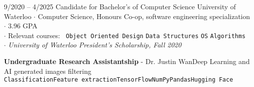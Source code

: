 \documentclass[8pt]{developercv} %
\begin{document}

\begin{minipage}[t]{\textwidth}
	\vspace{-\baselineskip} %

	\begin{entrylist}
		\entry
			{9/2020 -- 4/2025}
			{Candidate for Bachelor's of Computer Science}
			{University of Waterloo}
			{
				$\cdot$ Computer Science, Honours Co-op, software engineering specialization\\
				$\cdot$ 3.96 GPA\\
				$\cdot$ Relevant courses:
					\texttt{ Object Oriented Design}\slashsep
					\texttt{Data Structures}\slashsep
					\texttt{OS}\slashsep
					\texttt{Algorithms}\\
				$\cdot$ \textit{University of Waterloo President's Scholarship, Fall 2020}
			}
	\end{entrylist}
\end{minipage}



	



	\begin{minipage}[t]{\textwidth}
		\vspace{-\baselineskip} %
		\textbf{Undergraduate Research Assistantship} - Dr. Justin Wan\slashsep Deep Learning and AI generated images filtering \\
    \texttt{Classification}\slashsep\texttt{Feature extraction}\slashsep\texttt{TensorFlow}\slashsep\texttt{NumPy}\slashsep\texttt{Pandas}\slashsep\texttt{Hugging Face}
	\end{minipage}

\end{document}
